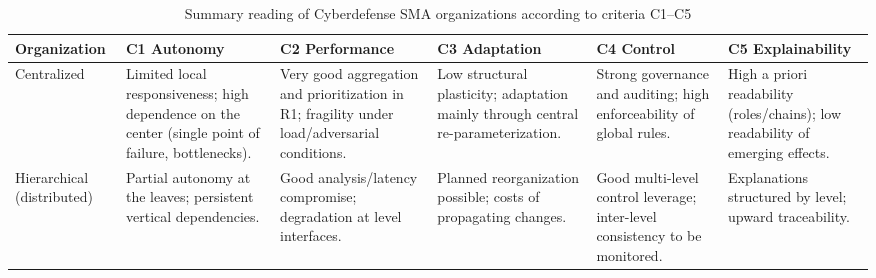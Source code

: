 \begin{table}[h!]
  \centering
  \caption{Summary reading of Cyberdefense SMA organizations according to criteria C1--C5}
  \label{tab:org-vs-criteria}
  \tiny
  \renewcommand{\arraystretch}{1.12}
  \begin{tabularx}{\linewidth}{
      >{\raggedright\arraybackslash\hsize=0.15\hsize}X
      >{\raggedright\arraybackslash\hsize=0.15\hsize}X
      >{\raggedright\arraybackslash\hsize=0.15\hsize}X
      >{\raggedright\arraybackslash\hsize=0.15\hsize}X
      >{\raggedright\arraybackslash\hsize=0.15\hsize}X
      >{\raggedright\arraybackslash\hsize=0.15\hsize}X}
    \toprule
    \textbf{Organization}                                                                               & \textbf{C1 Autonomy} & \textbf{C2 Performance} & \textbf{C3 Adaptation} & \textbf{C4 Control} & \textbf{C5 Explainability} \\
    \midrule
    Centralized                                                                                         &
    Limited local responsiveness; high dependence on the center (single point of failure, bottlenecks). &
    Very good aggregation and prioritization in R1; fragility under load/adversarial conditions.        &
    Low structural plasticity; adaptation mainly through central re-parameterization.                   &
    Strong governance and auditing; high enforceability of global rules.
                                                                                                        &
    High a priori readability (roles/chains); low readability of emerging effects.                                                                                                                                                   \\
    \addlinespace[2pt]
    Hierarchical (distributed)                                                                          &
    Partial autonomy at the leaves; persistent vertical dependencies.                                   &
    Good analysis/latency compromise; degradation at level interfaces.                                  &
    Planned reorganization possible; costs of propagating changes.                                      &
    Good multi-level control leverage; inter-level consistency to be monitored.                         &
    Explanations structured by level; upward traceability.                                                                                                                                                                           \\

\end{tabularx}
\end{table}
